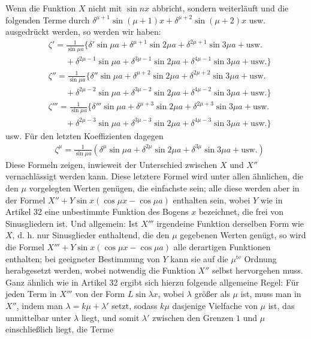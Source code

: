 \begingroup
\renewcommand{\arraystretch}{1.45}
Wenn die Funktion $X$ nicht mit $\sin nx$ abbricht, sondern weiterläuft und die folgenden Terme durch $\delta^{\mu+1}\sin(\mu+1)x+\delta^{\mu+2}\sin(\mu+2)x$ usw. ausgedrückt werden, so werden wir haben:
\[
\begin{aligned}
&\zeta'={}\frac{1}{\sin\mu a}\{\delta'\sin\mu a+\delta^{\mu+1}\sin 2\mu a+\delta^{2\mu+1}\sin 3\mu a+\text{usw.}\\[5pt]
&\qquad+\delta^{2\mu-1}\sin\mu a+\delta^{3\mu-1}\sin 2\mu a+\delta^{4\mu-1}\sin 3\mu a+\text{usw.}\}\\[5pt]
&\zeta''={}\frac{1}{\sin\mu a}\{\delta''\sin\mu a+\delta^{\mu+2}\sin 2\mu a+\delta^{2\mu+2}\sin 3\mu a+\text{usw.}\\[5pt]
&\qquad+\delta^{2\mu-2}\sin\mu a+\delta^{3\mu-2}\sin 2\mu a+\delta^{4\mu-2}\sin 3\mu a+\text{usw.}\}\\[5pt]
&\zeta'''={}\frac{1}{\sin\mu a}\{\delta'''\sin\mu a+\delta^{\mu+3}\sin 2\mu a+\delta^{2\mu+3}\sin 3\mu a+\text{usw.}\\[5pt]
&\qquad+\delta^{2\mu-3}\sin\mu a+\delta^{3\mu-3}\sin 2\mu a+\delta^{4\mu-3}\sin 3\mu a+\text{usw.}\}
\end{aligned}
\]
usw. Für den letzten Koeffizienten dagegen
\[
\begin{aligned}
&\zeta^{\mu}=\frac{1}{\sin\mu a}(\delta^{\mu}\sin\mu a+\delta^{2\mu}\sin 2\mu a+\delta^{3\mu}\sin 3\mu a+\text{usw.})
\end{aligned}
\]
Diese Formeln zeigen, inwieweit der Unterschied zwischen $X$ und $X''$ vernachlässigt werden kann. Diese letztere Formel wird unter allen ähnlichen, die den $\mu$ vorgelegten Werten genügen, die einfachste sein; alle diese werden aber in der Formel $X''+Y\sin x(\cos\mu x-\cos\mu a)$ enthalten sein, wobei $Y$ wie in Artikel 32 eine unbestimmte Funktion des Bogens $x$ bezeichnet, die frei von Sinusgliedern ist. Und allgemein: Ist $X'''$ irgendeine Funktion derselben Form wie $X$, d. h. nur Sinusglieder enthaltend, die den $\mu$ gegebenen Werten genügt, so wird die Formel $X'''+Y\sin x(\cos\mu x-\cos\mu a)$ alle derartigen Funktionen enthalten; bei geeigneter Bestimmung von $Y$ kann sie auf die $\mu^{\mathrm{te}}$ Ordnung herabgesetzt werden, wobei notwendig die Funktion $X''$ selbst hervorgehen muss. Ganz ähnlich wie in Artikel 32 ergibt sich hierzu folgende allgemeine Regel: Für jeden Term in $X'''$ von der Form $L\sin\lambda x$, wobei $\lambda$ größer als $\mu$ ist, muss man in $X''$, indem man $\lambda=k\mu+\lambda'$ setzt, sodass $k\mu$ dasjenige Vielfache von $\mu$ ist, das unmittelbar unter $\lambda$ liegt, und somit $\lambda'$ zwischen den Grenzen $1$ und $\mu$ einschließlich liegt, die Terme
